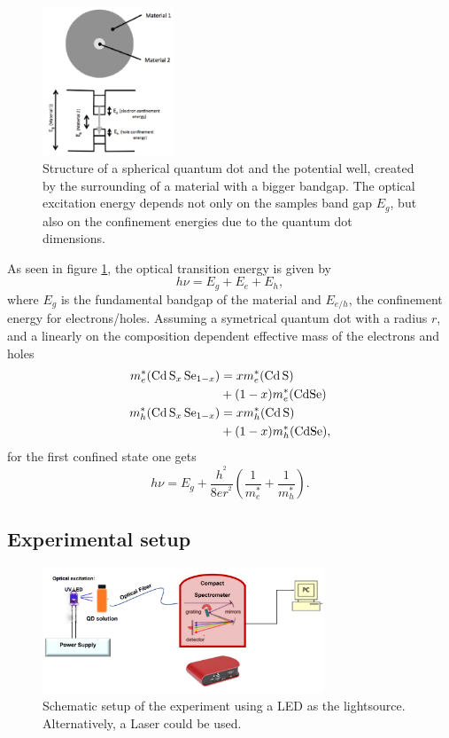 \begin{figure}
  \centering
  \includegraphics[width=0.35\textwidth]{graphics/QD.png}
  \caption[width=0.4\textwidth]{Structure of a spherical quantum dot and the potential well, created by the surrounding of a material with a bigger bandgap. The optical excitation energy depends not only on the samples band gap $E_g$, but also on the confinement energies due to the quantum dot dimensions\cite{instruction}.}
  \label{fig:QD}
\end{figure}

As seen in figure \ref{fig:QD}, the optical transition energy is given by
\begin{equation}
    h \nu = E_g + E_e + E_h,
\end{equation}
where $E_g$ is the fundamental bandgap of the material and $E_{e/h}$, the confinement energy for electrons/holes.
Assuming a symetrical quantum dot with a radius $r$, and a linearly on the composition dependent effective mass of the electrons and holes
\begin{align*}
m_e^*(\ce{Cd S_x Se_{1-x}}) &= x m_e^*(\ce{Cd S}) \\ &+ (1-x)m_e^* (\ce{CdSe}) \\
m_h^*(\ce{Cd S_x Se_{1-x}}) &= x m_h^*(\ce{Cd S}) \\ &+ (1-x)m_h^* (\ce{CdSe}),
\end{align*}
for the first confined state one gets
\begin{equation}
    h \nu = E_g + \frac{h^^2}{8er^^2}(\frac{1}{m_e^*} + \frac{1}{m_h^*}).
\end{equation}\label{eq:QD}

\subsection{Experimental setup}
\label{sec:setup}

\begin{figure}
    \centering
    \includegraphics[width=0.75\textwidth]{graphics/setup.png}
    \caption[width=0.8\textwidth]{Schematic setup of the experiment using a LED as the lightsource. Alternatively, a Laser could be used\cite{instruction}.}
    \label{fig:setup}
  \end{figure}

